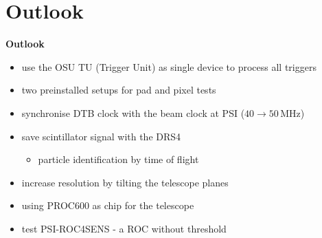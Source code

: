 \documentclass[9pt]{beamer}
\begin{document}
\section{Outlook}
\begin{frame}
	\begin{alertblock}{
		\begin{center}
			\Large{\textbf{Outlook}}
		\end{center}}
	\end{alertblock}
\end{frame}
\begin{frame}
	\begin{itemize}
		\vfill\item use the OSU TU (Trigger Unit) as single device to process all triggers
		\vfill\item two preinstalled setups for pad and pixel tests
		\vfill\item synchronise DTB clock with the beam clock at PSI ($40\rightarrow50$\,MHz)
		\vfill\item save scintillator signal with the DRS4
		\begin{itemize}
			\item particle identification by time of flight
		\end{itemize}
		\vfill\item increase resolution by tilting the telescope planes
		\vfill\item using PROC600 as chip for the telescope
		\vfill\item test PSI-ROC4SENS - a ROC without threshold
	\end{itemize}
\end{frame}
\end{document}
